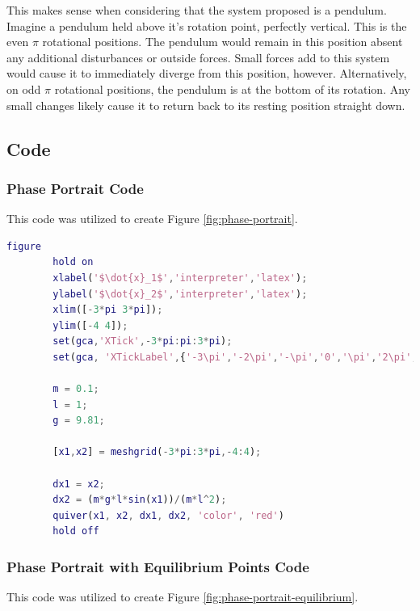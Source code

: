 \documentclass{article}
\begin{document}
This makes sense when considering that the system proposed is a pendulum. Imagine a pendulum held above it's rotation point, perfectly vertical. This is the even $\pi$ rotational positions. The pendulum would remain in this position absent any additional disturbances or outside forces. Small forces add to this system would cause it to immediately diverge from this position, however. Alternatively, on odd $\pi$ rotational positions, the pendulum is at the bottom of its rotation. Any small changes likely cause it to return back to its resting position straight down.

\subsection*{Code}

\subsubsection*{Phase Portrait Code}
This code was utilized to create Figure \ref{fig:phase-portrait}.

\begin{center}
    \begin{lstlisting}[caption={Phase Portrait MATLAB code},captionpos=b, language=MATLAB]
        figure
        hold on
        xlabel('$\dot{x}_1$','interpreter','latex');
        ylabel('$\dot{x}_2$','interpreter','latex');
        xlim([-3*pi 3*pi]);
        ylim([-4 4]);
        set(gca,'XTick',-3*pi:pi:3*pi);
        set(gca, 'XTickLabel',{'-3\pi','-2\pi','-\pi','0','\pi','2\pi','3\pi'});
        
        m = 0.1;
        l = 1;
        g = 9.81;
        
        [x1,x2] = meshgrid(-3*pi:3*pi,-4:4);
        
        dx1 = x2;
        dx2 = (m*g*l*sin(x1))/(m*l^2);
        quiver(x1, x2, dx1, dx2, 'color', 'red')
        hold off
    \end{lstlisting}
\end{center}

\subsubsection*{Phase Portrait with Equilibrium Points Code}
This code was utilized to create Figure \ref{fig:phase-portrait-equilibrium}.
\end{document}
